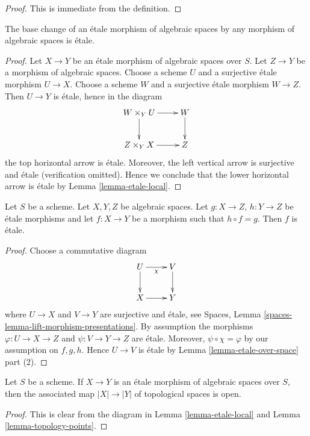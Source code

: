\begin{proof}
This is immediate from the definition.
\end{proof}

\begin{lemma}
\label{lemma-base-change-etale}
The base change of an \'etale morphism of algebraic spaces
by any morphism of algebraic spaces is \'etale.
\end{lemma}

\begin{proof}
Let $X \to Y$ be an \'etale morphism of algebraic spaces over $S$.
Let $Z \to Y$ be a morphism of algebraic spaces.
Choose a scheme $U$ and a surjective \'etale morphism $U \to X$.
Choose a scheme $W$ and a surjective \'etale morphism $W \to Z$.
Then $U \to Y$ is \'etale, hence in the diagram
$$
\xymatrix{
W \times_Y U \ar[d] \ar[r] & W \ar[d] \\
Z \times_Y X \ar[r] & Z
}
$$
the top horizontal arrow is \'etale.
Moreover, the left vertical arrow is surjective
and \'etale (verification omitted). Hence we conclude that the lower
horizontal arrow is \'etale by Lemma \ref{lemma-etale-local}.
\end{proof}

\begin{lemma}
\label{lemma-etale-permanence}
Let $S$ be a scheme. Let $X, Y, Z$ be algebraic spaces.
Let $g : X \to Z$, $h : Y \to Z$ be \'etale morphisms and let
$f : X \to Y$ be a morphism such that $h \circ f = g$.
Then $f$ is \'etale.
\end{lemma}

\begin{proof}
Choose a commutative diagram
$$
\xymatrix{
U \ar[d] \ar[r]_\chi & V \ar[d] \\
X \ar[r] & Y
}
$$
where $U \to X$ and $V \to Y$ are surjective and \'etale, see
Spaces, Lemma \ref{spaces-lemma-lift-morphism-presentations}.
By assumption the morphisms $\varphi : U \to X \to Z$ and
$\psi : V \to Y \to Z$ are \'etale. Moreover, $\psi \circ \chi = \varphi$
by our assumption on $f, g, h$.
Hence $U \to V$ is \'etale by Lemma \ref{lemma-etale-over-space}
part (2).
\end{proof}

\begin{lemma}
\label{lemma-etale-open}
Let $S$ be a scheme.
If $X \to Y$ is an \'etale morphism of algebraic spaces over $S$,
then the associated map $|X| \to |Y|$ of topological spaces
is open.
\end{lemma}

\begin{proof}
This is clear from the diagram in
Lemma \ref{lemma-etale-local}
and
Lemma \ref{lemma-topology-points}.
\end{proof}

